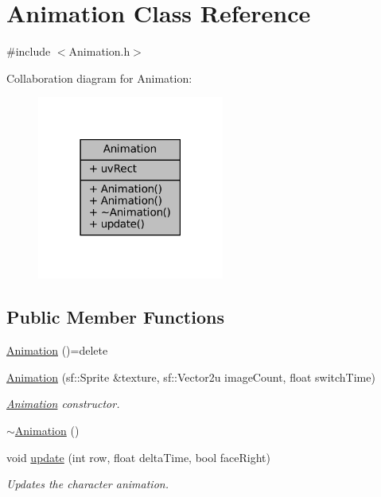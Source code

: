 \hypertarget{classAnimation}{}\section{Animation Class Reference}
\label{classAnimation}


{\ttfamily \#include $<$Animation.\+h$>$}



Collaboration diagram for Animation\+:\nopagebreak
\begin{figure}[H]
\begin{center}
\leavevmode
\includegraphics[width=174pt]{classAnimation__coll__graph}
\end{center}
\end{figure}
\subsection*{Public Member Functions}
\begin{DoxyCompactItemize}
\item 
\mbox{\hyperlink{classAnimation_a4c733083ff6e7c04ad06d73b5ccef398}{Animation}} ()=delete
\item 
\mbox{\hyperlink{classAnimation_aa8aaf286b114298e3ecbe1fc62572c27}{Animation}} (sf\+::\+Sprite \&texture, sf\+::\+Vector2u image\+Count, float switch\+Time)
\begin{DoxyCompactList}\small\item\em \mbox{\hyperlink{classAnimation}{Animation}} constructor. \end{DoxyCompactList}\item 
\mbox{\hyperlink{classAnimation_a401b68793d4fbf48d481c030ee4b2a16}{$\sim$\+Animation}} ()
\item 
void \mbox{\hyperlink{classAnimation_af09462caccc4d41ebfe288f703c4facd}{update}} (int row, float delta\+Time, bool face\+Right)
\begin{DoxyCompactList}\small\item\em Updates the character animation. \end{DoxyCompactList}\end{DoxyCompactItemize}

